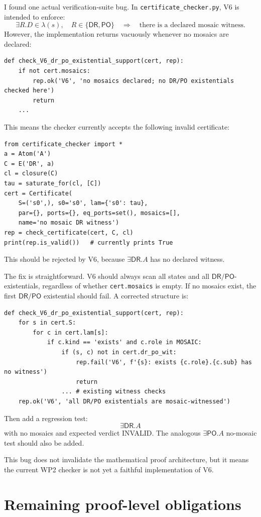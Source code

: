 \documentclass[11pt]{article}
\newcommand{\DR}{\mathsf{DR}}
\newcommand{\PO}{\mathsf{PO}}
\begin{document}
I found one actual verification-suite bug.  In \texttt{certificate\_checker.py}, V6 is intended to enforce:
\[
\exists R.D\in\lambda(s),\quad R\in\{\DR,\PO\}
\quad\Longrightarrow\quad
\text{there is a declared mosaic witness.}
\]
However, the implementation returns vacuously whenever no mosaics are declared:
\begin{verbatim}
def check_V6_dr_po_existential_support(cert, rep):
    if not cert.mosaics:
        rep.ok('V6', 'no mosaics declared; no DR/PO existentials checked here')
        return
    ...
\end{verbatim}
This means the checker currently accepts the following invalid certificate:
\begin{verbatim}
from certificate_checker import *
a = Atom('A')
C = E('DR', a)
cl = closure(C)
tau = saturate_for(cl, [C])
cert = Certificate(
    S=('s0',), s0='s0', lam={'s0': tau},
    par={}, ports={}, eq_ports=set(), mosaics=[],
    name='no mosaic DR witness')
rep = check_certificate(cert, C, cl)
print(rep.is_valid())   # currently prints True
\end{verbatim}
This should be rejected by V6, because \(\exists\DR.A\) has no declared witness.

The fix is straightforward.  V6 should always scan all states and all \(\DR/\PO\)-existentials, regardless of whether \texttt{cert.mosaics} is empty.  If no mosaics exist, the first \(\DR/\PO\) existential should fail.  A corrected structure is:
\begin{verbatim}
def check_V6_dr_po_existential_support(cert, rep):
    for s in cert.S:
        for c in cert.lam[s]:
            if c.kind == 'exists' and c.role in MOSAIC:
                if (s, c) not in cert.dr_po_wit:
                    rep.fail('V6', f'{s}: exists {c.role}.{c.sub} has no witness')
                    return
                ... # existing witness checks
    rep.ok('V6', 'all DR/PO existentials are mosaic-witnessed')
\end{verbatim}
Then add a regression test:
\[
\exists\DR.A
\]
with no mosaics and expected verdict INVALID.  The analogous \(\exists\PO.A\) no-mosaic test should also be added.

This bug does not invalidate the mathematical proof architecture, but it means the current WP2 checker is not yet a faithful implementation of V6.

\section{Remaining proof-level obligations}
\end{document}
